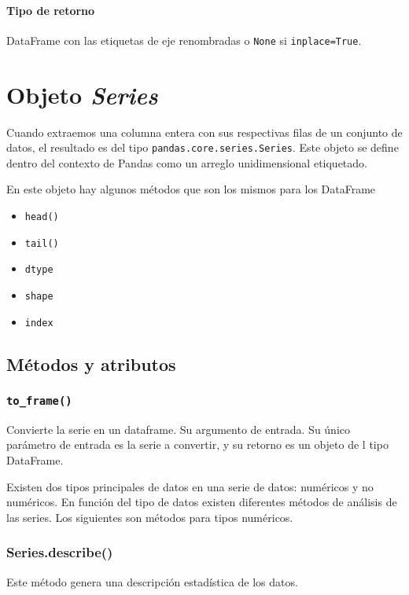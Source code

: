         \paragraph{Tipo de retorno}
        DataFrame con las etiquetas de eje renombradas o \texttt{None} si \texttt{inplace=True}.

    \section{Objeto \textit{Series}}

    Cuando extraemos una columna entera con sus respectivas filas de un conjunto de datos, el resultado es del tipo \texttt{pandas.core.series.Series}. Este objeto se define dentro del contexto de Pandas como un arreglo unidimensional etiquetado.

    En este objeto hay algunos métodos que son los mismos para los DataFrame

    \begin{itemize}
        \item \texttt{head()}
        \item \texttt{tail()}
        \item \texttt{dtype}
        \item \texttt{shape}
        \item \texttt{index}
    \end{itemize}

    \subsection{Métodos y atributos}

    \subsubsection{\texttt{to\_frame()}} Convierte la serie en un dataframe. Su argumento de entrada. Su único parámetro de entrada es la serie a convertir, y su retorno es un objeto de l tipo DataFrame.

    Existen dos tipos principales de datos en una serie de datos: numéricos y no numéricos. En función del tipo de datos existen diferentes métodos de análisis de las series. Los siguientes son métodos para tipos numéricos.

    \subsubsection{Series.describe()} Este método genera una descripción estadística de los datos.


